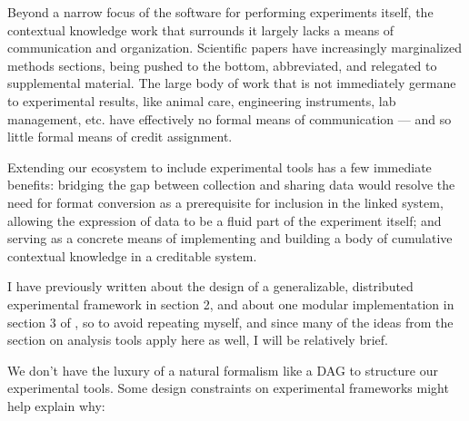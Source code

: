 \documentclass[notoc]{tufte-book}
\begin{document}
Beyond a narrow focus of the software for performing experiments itself,
the contextual knowledge work that surrounds it largely lacks a means of
communication and organization. Scientific papers have increasingly
marginalized methods sections, being pushed to the bottom, abbreviated,
and relegated to supplemental material. The large body of work that is
not immediately germane to experimental results, like animal care,
engineering instruments, lab management, etc. have effectively no formal
means of communication --- and so little formal means of credit
assignment.

Extending our ecosystem to include experimental tools has a few
immediate benefits: bridging the gap between collection and sharing data
would resolve the need for format conversion as a prerequisite for
inclusion in the linked system, allowing the expression of data to be a
fluid part of the experiment itself; and serving as a concrete means of
implementing and building a body of cumulative contextual knowledge in a
creditable system.

I have previously written about the design of a generalizable,
distributed experimental framework in section 2, and about one modular
implementation in section 3 of \citep{saundersAutopilotAutomatingBehavioral2019} , so to avoid repeating
myself, and since many of the ideas from the section on analysis tools
apply here as well, I will be relatively brief.

We don't have the luxury of a natural formalism like a DAG to structure
our experimental tools. Some design constraints on experimental
frameworks might help explain why:
\end{document}
